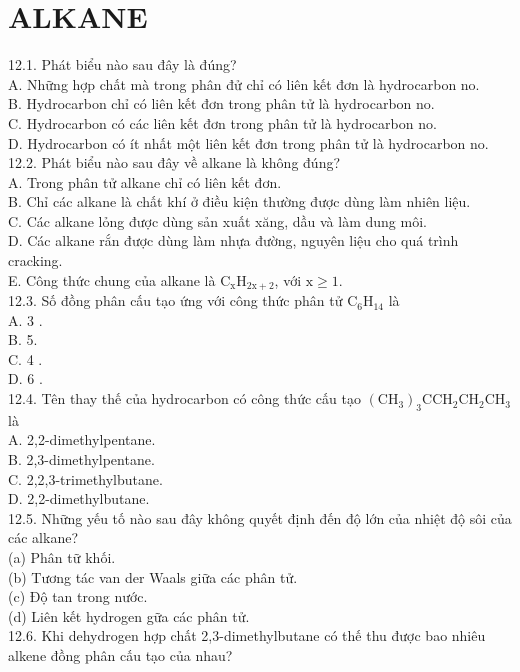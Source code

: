 \documentclass[10pt]{article}
\begin{document}
\section*{ALKANE}
12.1. Phát biểu nào sau đây là đúng?\\
A. Những hợp chất mà trong phân đử chỉ có liên kết đơn là hydrocarbon no.\\
B. Hydrocarbon chỉ có liên kết đơn trong phân tử là hydrocarbon no.\\
C. Hydrocarbon có các liên kết đơn trong phân tử là hydrocarbon no.\\
D. Hydrocarbon có ít nhất một liên kết đơn trong phân tử là hydrocarbon no.\\
12.2. Phát biểu nào sau đây về alkane là không đúng?\\
A. Trong phân tử alkane chỉ có liên kết đơn.\\
B. Chỉ các alkane là chất khí ở điều kiện thường được dùng làm nhiên liệu.\\
C. Các alkane lỏng được dùng sản xuất xăng, dầu và làm dung môi.\\
D. Các alkane rắn được dùng làm nhựa đường, nguyên liệu cho quá trình cracking.\\
E. Công thức chung của alkane là $\mathrm{C}_{\mathrm{x}} \mathrm{H}_{2 \mathrm{x}+2}$, với $\mathrm{x} \geq 1$.\\
12.3. Số đồng phân cấu tạo ứng với công thức phân tử $\mathrm{C}_{6} \mathrm{H}_{14}$ là\\
A. 3 .\\
B. 5.\\
C. 4 .\\
D. 6 .\\
12.4. Tên thay thế của hydrocarbon có công thức cấu tạo $\left(\mathrm{CH}_{3}\right)_{3} \mathrm{CCH}_{2} \mathrm{CH}_{2} \mathrm{CH}_{3}$ là\\
A. 2,2-dimethylpentane.\\
B. 2,3-dimethylpentane.\\
C. 2,2,3-trimethylbutane.\\
D. 2,2-dimethylbutane.\\
12.5. Những yếu tố nào sau đây không quyết định đến độ lớn của nhiệt độ sôi của các alkane?\\
(a) Phân tữ khối.\\
(b) Tương tác van der Waals giữa các phân tử.\\
(c) Độ tan trong nước.\\
(d) Liên kết hydrogen gữa các phân tử.\\
12.6. Khi dehydrogen hợp chất 2,3-dimethylbutane có thế thu được bao nhiêu alkene đồng phân cấu tạo của nhau?\\
\end{document}
